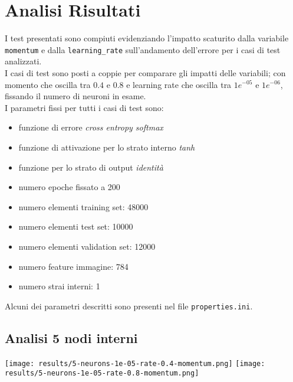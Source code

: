 \chapter{Analisi Risultati}
I test presentati sono compiuti evidenziando l'impatto scaturito dalla variabile \texttt{momentum} e dalla \texttt{learning\_rate} sull'andamento dell'errore per i casi di test analizzati.\\
I casi di test sono posti a coppie per comparare gli impatti delle variabili; con momento che oscilla tra  $0.4$ e $0.8$ e learning rate che oscilla tra $1e^{-05}$ e $1e^{-06}$, fissando il numero di neuroni in esame. \\
I parametri fissi per tutti i casi di test sono: 
\begin{itemize}
    \item funzione di errore \textit{cross entropy softmax}
    \item funzione di attivazione per lo strato interno \textit{tanh}
    \item funzione per lo strato di output \textit{identità}
    \item numero epoche fissato a 200
    \item numero elementi training set: 48000
    \item numero elementi test set: 10000
    \item numero elementi validation set: 12000
    \item numero feature immagine: 784
    \item numero strai interni: 1
\end{itemize}
Alcuni dei parametri descritti sono presenti nel file \texttt{properties.ini}.
{\clearpage}
\section{Analisi 5 nodi interni}
\begin{center}
\texttt{[image: results/5-neurons-1e-05-rate-0.4-momentum.png]}
\texttt{[image: results/5-neurons-1e-05-rate-0.8-momentum.png]}
\end{center}

